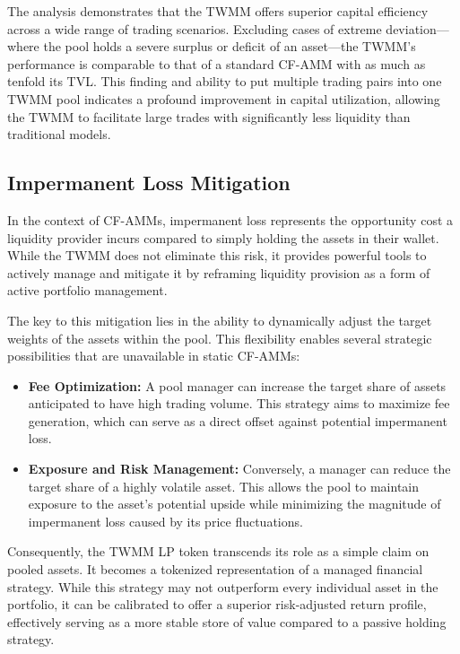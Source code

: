 The analysis demonstrates that the TWMM offers superior capital efficiency across a wide range of trading scenarios. Excluding cases of extreme deviation—where the pool holds a severe surplus or deficit of an asset—the TWMM's performance is comparable to that of a standard CF-AMM with as much as tenfold its TVL. This finding and ability to put multiple trading pairs into one TWMM pool indicates a profound improvement in capital utilization, allowing the TWMM to facilitate large trades with significantly less liquidity than traditional models.

\subsection{Impermanent Loss Mitigation}

In the context of CF-AMMs, impermanent loss represents the opportunity cost a liquidity provider incurs compared to simply holding the assets in their wallet. While the TWMM does not eliminate this risk, it provides powerful tools to actively manage and mitigate it by reframing liquidity provision as a form of active portfolio management.

The key to this mitigation lies in the ability to dynamically adjust the target weights of the assets within the pool. This flexibility enables several strategic possibilities that are unavailable in static CF-AMMs:
\begin{itemize}
	\item \textbf{Fee Optimization:} A pool manager can increase the target share of assets anticipated to have high trading volume. This strategy aims to maximize fee generation, which can serve as a direct offset against potential impermanent loss.
	
	\item \textbf{Exposure and Risk Management:} Conversely, a manager can reduce the target share of a highly volatile asset. This allows the pool to maintain exposure to the asset's potential upside while minimizing the magnitude of impermanent loss caused by its price fluctuations.
\end{itemize}

Consequently, the TWMM LP token transcends its role as a simple claim on pooled assets. It becomes a tokenized representation of a managed financial strategy. While this strategy may not outperform every individual asset in the portfolio, it can be calibrated to offer a superior risk-adjusted return profile, effectively serving as a more stable store of value compared to a passive holding strategy.